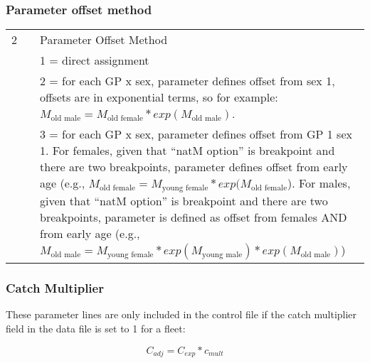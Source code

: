 \subsubsection{Parameter offset method}

\begin{longtable}{p{0.5cm} p{2cm} p{12cm}}

\hline

	  2 & & Parameter Offset Method \\
	    & & 1 = direct assignment \\
	    & & 2 = for each GP x sex, parameter defines offset from sex 1, offsets are in exponential terms, so for example: $M_{\text{old male}} = M_{\text{old female}}*exp(M_{\text{old male}})$. \\
	    & & 3 = for each GP x sex, parameter defines offset from GP 1 sex 1.  For females, given that “natM option” is breakpoint and there are two breakpoints, parameter defines offset from early age (e.g., $M_{\text{old female}} = M_{\text{young female}}*exp(M_{\text{old female}}$). For males, given that “natM option” is breakpoint and there are two breakpoints, parameter is defined as offset from females AND from early age (e.g., $M_{\text{old male}} = M_{\text{young female}}*exp(M_{\text{young male}})*exp(M_{\text{old male}})$)\\
	 \hline


	\end{longtable}


\subsubsection{Catch Multiplier}
These  parameter lines are only included in the control file if the catch multiplier field in the data file is set to 1 for a fleet:

\begin{equation}
C_{adj} = C_{exp} * c_{mult}
\end{equation}

